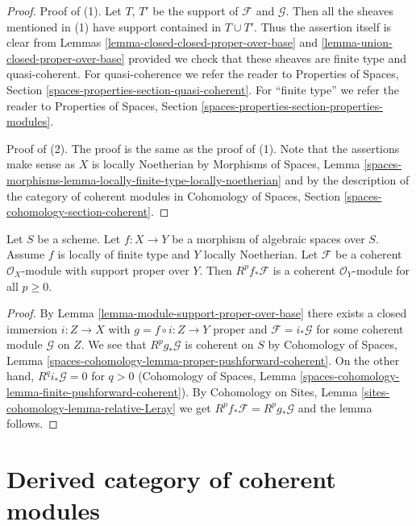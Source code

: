 \begin{proof}
Proof of (1). Let $T$, $T'$ be the support of $\mathcal{F}$
and $\mathcal{G}$. Then all the sheaves mentioned in (1)
have support contained in $T \cup T'$. Thus the assertion itself
is clear from Lemmas \ref{lemma-closed-closed-proper-over-base} and
\ref{lemma-union-closed-proper-over-base}
provided we check that these sheaves are finite type
and quasi-coherent.
For quasi-coherence we refer the reader to
Properties of Spaces, Section \ref{spaces-properties-section-quasi-coherent}.
For ``finite type'' we refer the reader to
Properties of Spaces, Section
\ref{spaces-properties-section-properties-modules}.

\medskip\noindent
Proof of (2). The proof is the same as the proof of (1). Note that
the assertions make sense as $X$ is locally Noetherian by
Morphisms of Spaces, Lemma
\ref{spaces-morphisms-lemma-locally-finite-type-locally-noetherian}
and by the description of the category of coherent modules in
Cohomology of Spaces, Section \ref{spaces-cohomology-section-coherent}.
\end{proof}

\begin{lemma}
\label{lemma-support-proper-over-base-pushforward}
Let $S$ be a scheme. Let $f : X \to Y$ be a morphism of algebraic spaces
over $S$. Assume $f$ is locally of finite type and $Y$ locally Noetherian.
Let $\mathcal{F}$ be a coherent $\mathcal{O}_X$-module with support
proper over $Y$. Then $R^pf_*\mathcal{F}$ is a coherent
$\mathcal{O}_Y$-module for all $p \geq 0$.
\end{lemma}

\begin{proof}
By Lemma \ref{lemma-module-support-proper-over-base}
there exists a closed immersion $i : Z \to X$ with
$g = f \circ i : Z \to Y$ proper and
$\mathcal{F} = i_*\mathcal{G}$ for some coherent module $\mathcal{G}$
on $Z$. We see that $R^pg_*\mathcal{G}$
is coherent on $S$ by Cohomology of Spaces, Lemma
\ref{spaces-cohomology-lemma-proper-pushforward-coherent}.
On the other hand, $R^qi_*\mathcal{G} = 0$ for $q > 0$
(Cohomology of Spaces, Lemma
\ref{spaces-cohomology-lemma-finite-pushforward-coherent}).
By Cohomology on Sites, Lemma \ref{sites-cohomology-lemma-relative-Leray}
we get $R^pf_*\mathcal{F} = R^pg_*\mathcal{G}$ and the lemma follows.
\end{proof}






\section{Derived category of coherent modules}
\label{section-derived-coherent}

